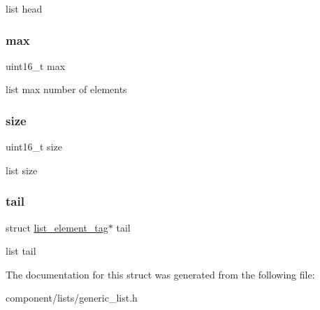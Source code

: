 list head \mbox{\label{structlist__label_ac66b569507cc273bbf83ce5dd5f70e84}} 
\subsubsection{\texorpdfstring{max}{max}}
{\footnotesize\ttfamily uint16\+\_\+t max}

list max number of elements \mbox{\label{structlist__label_aaba88b24a21a6c70c895c0d55f4a69a0}} 
\subsubsection{\texorpdfstring{size}{size}}
{\footnotesize\ttfamily uint16\+\_\+t size}

list size \mbox{\label{structlist__label_ad9735ff98cf587287750ced69a81f231}} 
\subsubsection{\texorpdfstring{tail}{tail}}
{\footnotesize\ttfamily struct \mbox{\hyperlink{structlist__element__tag}{list\+\_\+element\+\_\+tag}}$\ast$ tail}

list tail 

The documentation for this struct was generated from the following file\+:\begin{DoxyCompactItemize}
\item 
component/lists/generic\+\_\+list.\+h\end{DoxyCompactItemize}
